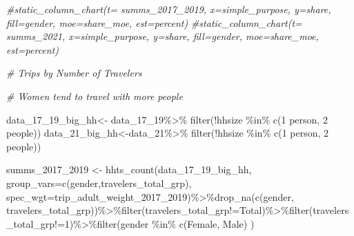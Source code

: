 \documentclass[
  12pt,
]{article}
\newenvironment{Shaded}{\begin{snugshade}}{\end{snugshade}}
\newcommand{\AttributeTok}[1]{\textcolor[rgb]{0.77,0.63,0.00}{#1}}
\newcommand{\CommentTok}[1]{\textcolor[rgb]{0.56,0.35,0.01}{\textit{#1}}}
\newcommand{\FunctionTok}[1]{\textcolor[rgb]{0.00,0.00,0.00}{#1}}
\newcommand{\NormalTok}[1]{#1}
\newcommand{\OtherTok}[1]{\textcolor[rgb]{0.56,0.35,0.01}{#1}}
\newcommand{\SpecialCharTok}[1]{\textcolor[rgb]{0.00,0.00,0.00}{#1}}
\newcommand{\StringTok}[1]{\textcolor[rgb]{0.31,0.60,0.02}{#1}}
\begin{document}
\begin{Shaded}
\begin{Highlighting}[]
 

\CommentTok{\#static\_column\_chart(t= summs\_2017\_2019, x=\textquotesingle{}simple\_purpose\textquotesingle{}, y=\textquotesingle{}share\textquotesingle{},  fill=\textquotesingle{}gender\textquotesingle{}, moe=\textquotesingle{}share\_moe\textquotesingle{}, est=\textquotesingle{}percent\textquotesingle{})}
\CommentTok{\#static\_column\_chart(t= summs\_2021, x=\textquotesingle{}simple\_purpose\textquotesingle{}, y=\textquotesingle{}share\textquotesingle{},  fill=\textquotesingle{}gender\textquotesingle{}, moe=\textquotesingle{}share\_moe\textquotesingle{}, est=\textquotesingle{}percent\textquotesingle{})}
\end{Highlighting}
\end{Shaded}

\begin{Shaded}
\begin{Highlighting}[]
\CommentTok{\# Trips by Number of Travelers}

\CommentTok{\# Women tend to travel with more people}

\NormalTok{data\_17\_19\_big\_hh}\OtherTok{\textless{}{-}}\NormalTok{ data\_17\_19}\SpecialCharTok{\%\textgreater{}\%}
  \FunctionTok{filter}\NormalTok{(}\SpecialCharTok{!}\NormalTok{hhsize }\SpecialCharTok{\%in\%} \FunctionTok{c}\NormalTok{(}\StringTok{\textquotesingle{}1 person\textquotesingle{}}\NormalTok{, }\StringTok{\textquotesingle{}2 people\textquotesingle{}}\NormalTok{))}
\NormalTok{data\_21\_big\_hh}\OtherTok{\textless{}{-}}\NormalTok{data\_21}\SpecialCharTok{\%\textgreater{}\%}
  \FunctionTok{filter}\NormalTok{(}\SpecialCharTok{!}\NormalTok{hhsize }\SpecialCharTok{\%in\%} \FunctionTok{c}\NormalTok{(}\StringTok{\textquotesingle{}1 person\textquotesingle{}}\NormalTok{, }\StringTok{\textquotesingle{}2 people\textquotesingle{}}\NormalTok{))}

\NormalTok{  summs\_2017\_2019 }\OtherTok{\textless{}{-}} \FunctionTok{hhts\_count}\NormalTok{(data\_17\_19\_big\_hh,}
                                        \AttributeTok{group\_vars=}\FunctionTok{c}\NormalTok{(}\StringTok{\textquotesingle{}gender\textquotesingle{}}\NormalTok{,}\StringTok{\textquotesingle{}travelers\_total\_grp\textquotesingle{}}\NormalTok{),}
                                        \AttributeTok{spec\_wgt=}\StringTok{\textquotesingle{}trip\_adult\_weight\_2017\_2019\textquotesingle{}}\NormalTok{)}\SpecialCharTok{\%\textgreater{}\%}\FunctionTok{drop\_na}\NormalTok{(}\FunctionTok{c}\NormalTok{(}\StringTok{\textquotesingle{}gender\textquotesingle{}}\NormalTok{, }\StringTok{\textquotesingle{}travelers\_total\_grp\textquotesingle{}}\NormalTok{))}\SpecialCharTok{\%\textgreater{}\%}\FunctionTok{filter}\NormalTok{(travelers\_total\_grp}\SpecialCharTok{!=}\StringTok{\textquotesingle{}Total\textquotesingle{}}\NormalTok{)}\SpecialCharTok{\%\textgreater{}\%}\FunctionTok{filter}\NormalTok{(travelers\_total\_grp}\SpecialCharTok{!=}\StringTok{\textquotesingle{}1\textquotesingle{}}\NormalTok{)}\SpecialCharTok{\%\textgreater{}\%}\FunctionTok{filter}\NormalTok{(gender }\SpecialCharTok{\%in\%} \FunctionTok{c}\NormalTok{(}\StringTok{\textquotesingle{}Female\textquotesingle{}}\NormalTok{, }\StringTok{\textquotesingle{}Male\textquotesingle{}}\NormalTok{) )}


\end{Highlighting}
\end{Shaded}
\end{document}
